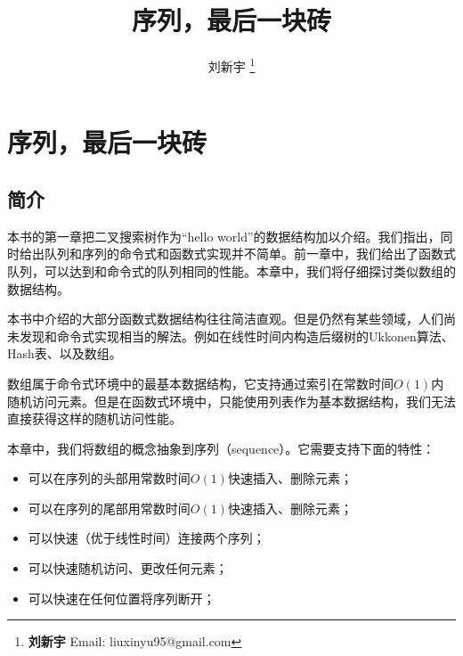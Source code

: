 \documentclass[UTF8]{article}
\begin{document}


\title{序列，最后一块砖}

\author{刘新宇
\thanks{{\bfseries 刘新宇 } \newline
  Email: liuxinyu95@gmail.com \newline}
  }

\maketitle
\fi


\ifx\wholebook\relax
\chapter{序列，最后一块砖}
\fi

\section{简介}
\label{introduction}
本书的第一章把二叉搜索树作为“hello world”的数据结构加以介绍。我们指出，同时给出队列和序列的命令式和函数式实现并不简单。前一章中，我们给出了函数式队列，可以达到和命令式的队列相同的性能。本章中，我们将仔细探讨类似数组的数据结构。

本书中介绍的大部分函数式数据结构往往简洁直观。但是仍然有某些领域，人们尚未发现和命令式实现相当的解法。例如在线性时间内构造后缀树的Ukkonen算法、Hash表、以及数组。

数组属于命令式环境中的最基本数据结构，它支持通过索引在常数时间$O(1)$内随机访问元素。但是在函数式环境中，只能使用列表作为基本数据结构，我们无法直接获得这样的随机访问性能。

本章中，我们将数组的概念抽象到序列（sequence）。它需要支持下面的特性：

\begin{itemize}
\item 可以在序列的头部用常数时间$O(1)$快速插入、删除元素；
\item 可以在序列的尾部用常数时间$O(1)$快速插入、删除元素；
\item 可以快速（优于线性时间）连接两个序列；
\item 可以快速随机访问、更改任何元素；
\item 可以快速在任何位置将序列断开；
\end{itemize}
\end{document}
